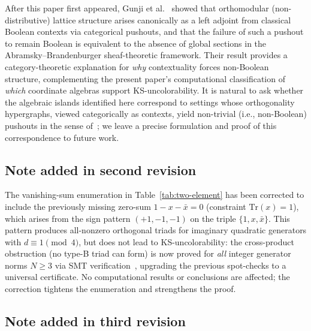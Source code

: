 \documentclass[12pt,a4paper]{article}
\begin{document}
\begin{sloppypar}
After this paper first appeared, Gunji et al.~\cite{GunjiOhzawa2026} showed that orthomodular (non-distributive) lattice structure arises canonically as a left adjoint from classical Boolean contexts via categorical pushouts, and that the failure of such a pushout to remain Boolean is equivalent to the absence of global sections in the Abramsky--Brandenburger sheaf-theoretic framework.  Their result provides a category-theoretic explanation for \emph{why} contextuality forces non-Boolean structure, complementing the present paper's computational classification of \emph{which} coordinate algebras support KS-uncolorability.  It is natural to ask whether the algebraic islands identified here correspond to settings whose orthogonality hypergraphs, viewed categorically as contexts, yield non-trivial (i.e., non-Boolean) pushouts in the sense of~\cite{GunjiOhzawa2026}; we leave a precise formulation and proof of this correspondence to future work.
\end{sloppypar}

\subsection*{Note added in second revision}

The vanishing-sum enumeration in Table~\ref{tab:two-element} has been corrected to include the previously missing zero-sum $1 - x - \bar{x} = 0$ (constraint $\mathrm{Tr}(x) = 1$), which arises from the sign pattern $(+1, -1, -1)$ on the triple $\{1, x, \bar{x}\}$.  This pattern produces all-nonzero orthogonal triads for imaginary quadratic generators with $d \equiv 1 \pmod{4}$, but does not lead to KS-uncolorability: the cross-product obstruction (no type-B triad can form) is now proved for \emph{all} integer generator norms $N \geq 3$ via SMT verification~\cite{deMouraBjorner2008}, upgrading the previous spot-checks to a universal certificate.  No computational results or conclusions are affected; the correction tightens the enumeration and strengthens the proof.

\subsection*{Note added in third revision}
\end{document}
